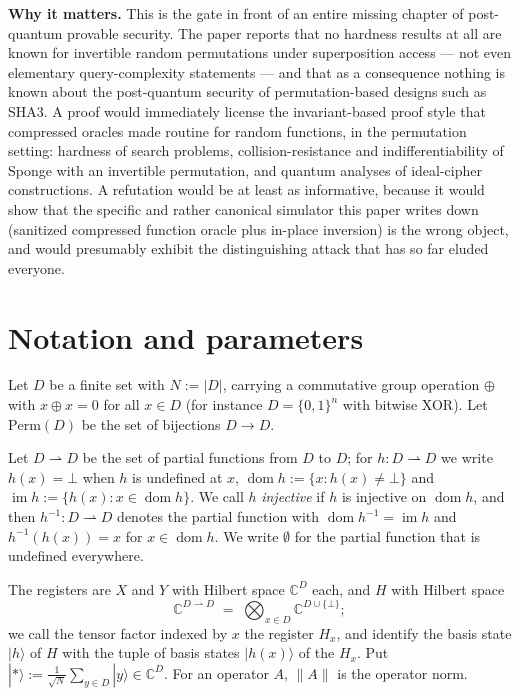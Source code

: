 \documentclass{aicr-conjecture}
\newcommand{\ket}[1]{|#1\rangle}
\newcommand{\unif}{\ket{{*}}}
\newcommand{\pto}{\rightharpoonup}
\newcommand{\Perm}{\mathrm{Perm}}
\newcommand{\CC}{\mathbb{C}}
\begin{document}
\textbf{Why it matters.} This is the gate in front of an entire missing
chapter of post-quantum provable security. The paper reports that no
hardness results at all are known for invertible random permutations
under superposition access --- not even elementary query-complexity
statements --- and that as a consequence nothing is known about the
post-quantum security of permutation-based designs such as SHA3. A
proof would immediately license the invariant-based proof style that
compressed oracles made routine for random functions, in the
permutation setting: hardness of search problems, collision-resistance
and indifferentiability of Sponge with an invertible permutation, and
quantum analyses of ideal-cipher constructions. A refutation would be
at least as informative, because it would show that the specific and
rather canonical simulator this paper writes down (sanitized compressed
function oracle plus in-place inversion) is the wrong object, and would
presumably exhibit the distinguishing attack that has so far eluded
everyone.

\section{Notation and parameters}\label{sec:notation}

Let $D$ be a finite set with $N := |D|$, carrying a commutative group
operation $\oplus$ with $x \oplus x = 0$ for all $x \in D$ (for
instance $D = \{0,1\}^n$ with bitwise XOR). Let $\Perm(D)$ be the set
of bijections $D \to D$.

Let $D \pto D$ be the set of partial functions from $D$ to $D$; for
$h : D \pto D$ we write $h(x) = \bot$ when $h$ is undefined at $x$,
$\operatorname{dom} h := \{x : h(x) \neq \bot\}$ and
$\operatorname{im} h := \{h(x) : x \in \operatorname{dom} h\}$. We call
$h$ \emph{injective} if $h$ is injective on $\operatorname{dom} h$, and
then $h^{-1} : D \pto D$ denotes the partial function with
$\operatorname{dom} h^{-1} = \operatorname{im} h$ and
$h^{-1}(h(x)) = x$ for $x \in \operatorname{dom} h$. We write
$\emptyset$ for the partial function that is undefined everywhere.

The registers are $X$ and $Y$ with Hilbert space $\CC^D$ each, and $H$
with Hilbert space
\[
  \CC^{D \pto D} \;=\; \bigotimes_{x \in D} \CC^{D \cup \{\bot\}};
\]
we call the tensor factor indexed by $x$ the register $H_x$, and
identify the basis state $\ket{h}$ of $H$ with the tuple of basis
states $\ket{h(x)}$ of the $H_x$. Put
$\unif := \frac{1}{\sqrt{N}} \sum_{y \in D} \ket{y} \in \CC^{D}$. For
an operator $A$, $\|A\|$ is the operator norm.
\end{document}

